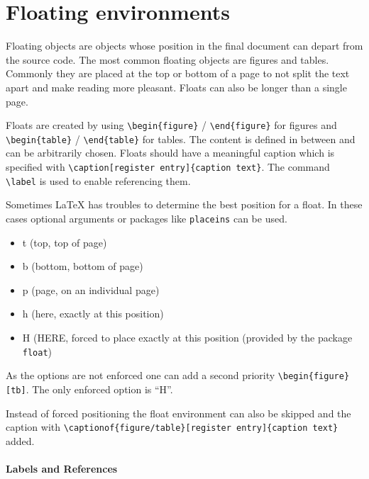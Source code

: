 	\section{Floating environments}
	\label{sec:floatenvironments}
	
		Floating objects are objects whose position in the final document can depart from the source code. The most common floating objects are figures and tables. Commonly they are placed at the top or bottom of a page to not split the text apart and make reading more pleasant. Floats can also be longer than a single page.
		
		Floats are created by using \verb|\begin{figure}| / \verb|\end{figure}| for figures and \verb|\begin{table}| / \verb|\end{table}| for tables. The content is defined in between and can be arbitrarily chosen. Floats should have a meaningful caption which is specified with \texttt{{\textbackslash}caption[register entry]\{caption text\}}. The command \texttt{{\textbackslash}label} is used to enable referencing them.
		
		Sometimes {\LaTeX} has troubles to determine the best position for a float. In these cases optional arguments or packages like \texttt{placeins} can be used.
		
		\begin{itemize}
			\item t (top, top of page)
			\item b (bottom, bottom of page)
			\item p (page, on an individual page)
			\item h (here, exactly at this position)
			\item H (HERE, forced to place exactly at this position (provided by the package \texttt{float})
		\end{itemize}
		
		As the options are not enforced one can add a second priority \verb|\begin{figure}[tb]|. The only enforced option is \enquote{H}.

		Instead of forced positioning the float environment can also be skipped and the caption with \texttt{{\textbackslash}captionof\{figure/table\}[register entry]\{caption text\}} added.
		
		\paragraph{Labels and References}
		
